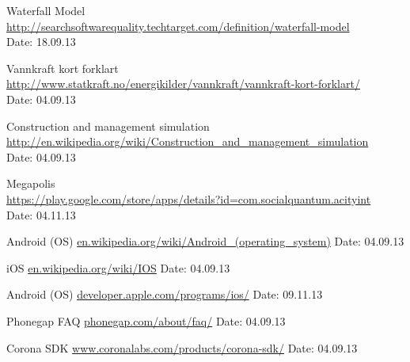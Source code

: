 \begin{thebibliography}{99}
	Waterfall Model \\
	\href {http://searchsoftwarequality.techtarget.com/definition/waterfall-model}{http://searchsoftwarequality.techtarget.com/definition/waterfall-model} \\
	Date: 18.09.13

	Vannkraft kort forklart \\
	\href {http://www.statkraft.no/energikilder/vannkraft/vannkraft-kort-forklart/}{http://www.statkraft.no/energikilder/vannkraft/vannkraft-kort-forklart/} \\
	Date: 04.09.13

	Construction and management simulation \\
	\href {http://en.wikipedia.org/wiki/Construction_and_management_simulation}{http://en.wikipedia.org/wiki/Construction\_and\_management\_simulation} \\
	Date: 04.09.13

	Megapolis \\
	\href {https://play.google.com/store/apps/details?id=com.socialquantum.acityint}{https://play.google.com/store/apps/details?id=com.socialquantum.acityint} \\
	Date: 04.11.13

	Android (OS)\newline
	\href {http://en.wikipedia.org/wiki/Android\_(operating_system)}{en.wikipedia.org/wiki/Android\_(operating\_system)}\newline
	Date: 04.09.13

	iOS\newline
	\href {http://en.wikipedia.org/wiki/IOS}{en.wikipedia.org/wiki/IOS}\newline
	Date: 04.09.13

	Android (OS)\newline
	\href {https://developer.apple.com/programs/ios/}{developer.apple.com/programs/ios/}\newline
	Date: 09.11.13

	Phonegap FAQ\newline
	\href {http://phonegap.com/about/faq/}{phonegap.com/about/faq/}\newline
	Date: 04.09.13

	Corona SDK\newline
	\href {http://www.coronalabs.com/products/corona-sdk/}{www.coronalabs.com/products/corona-sdk/}\newline
	Date: 04.09.13


\end{thebibliography}
